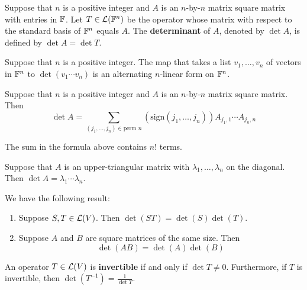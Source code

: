 \documentclass{extarticle}
\begin{document}
\begin{definition}
    Suppose that \(n\) is a positive integer and \(A\) is an \(n\)-by-\(n\) matrix square matrix with entries in \(\mathbb{F}\). 
    Let \(T \in \mathcal{L}(\mathbb{F}^n)\) be the operator whose matrix with respect to the standard basis of \(\mathbb{F}^n\) 
    equals \(A\). The \textbf{determinant} of \(A\), denoted by \(\det A\), is defined by 
    \(\det A = \det T\).
\end{definition}

\begin{thm}
    Suppose that \(n\) is a positive integer. The map that takes a list \(v_1, \ldots, v_n\) of vectors 
    in \(\mathbb{F}^n\) to \(\det (v_1 \cdots v_n)\) is an alternating \(n\)-linear form on \(\mathbb{F}^n\).
\end{thm}

\begin{corollary}
    Suppose that \(n\) is a positive integer and \(A\) is an \(n\)-by-\(n\) matrix square matrix. Then 
    \[\det A = \sum_{(j_1, \ldots, j_n) \in \text{perm } n} \left( \text{sign}(j_1, \ldots, j_n) \right) 
    A_{j_1, 1} \cdots A_{j_n, n}\]
\end{corollary}

\begin{remark}
    The sum in the formula above contains \(n!\) terms. 
\end{remark}

\begin{corollary}
    Suppose that \(A\) is an upper-triangular matrix with \(\lambda_1, \ldots, \lambda_n\) on the diagonal. 
    Then \(\det A = \lambda_1 \cdots \lambda_n\). 
\end{corollary}

\begin{thm}
    We have the following result: 
    \begin{enumerate}[label=(\alph*)]
        \item Suppose \(S, T \in \mathcal{L}(V)\). Then \(\det (ST) = \det (S) \det (T)\). 
        \item Suppose \(A\) and \(B\) are square matrices of the same size. Then 
        \[\det (AB) = \det (A) \det (B)\]
    \end{enumerate}
\end{thm}

\begin{corollary}
    An operator \(T \in \mathcal{L}(V)\) is \textbf{invertible} if and only if \(\det T \neq 0\). Furthermore, 
    if \(T\) is invertible, then \(\det (T^{-1}) = \frac{1}{\det T}\).
\end{corollary}
\end{document}
